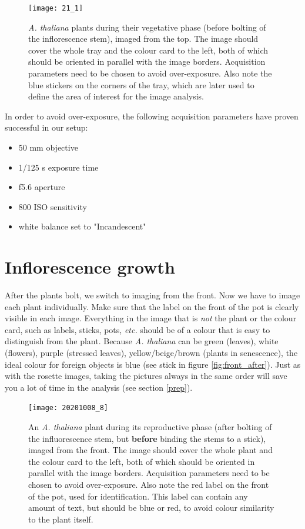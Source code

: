 \documentclass[10pt]{article}
\begin{document}
 	\begin{figure}[!h]
 		\centering
 		\texttt{[image: 21\_1]}
 		\caption[Example image of a top-view image.]{\textit{A. thaliana} plants during their vegetative phase (before bolting of the inflorescence stem), imaged from the top. The image should cover the whole tray and the colour card to the left, both of which should be oriented in parallel with the image borders. Acquisition parameters need to be chosen to avoid over-exposure. Also note the blue stickers on the corners of the tray, which are later used to define the area of interest for the image analysis.}
 		\label{fig:top}
 	\end{figure}
 
 	\noindent In order to avoid over-exposure, the following acquisition parameters have proven successful in our setup:
 
	 \begin{itemize}
	 	\item 50 mm objective
	 	\item 1/125 s exposure time
	 	\item f5.6 aperture
	 	\item 800 ISO sensitivity
	 	\item white balance set to "Incandescent"
	 \end{itemize}
 
 	\section{Inflorescence growth}
 	
 	After the plants bolt, we switch to imaging from the front. Now we have to image each plant individually. Make sure that the label on the front of the pot is clearly visible in each image. Everything in the image that is \textit{not} the plant or the colour card, such as labels, sticks, pots, \textit{etc.} should be of a colour that is easy to distinguish from the plant. Because \textit{A. thaliana} can be green (leaves), white (flowers), purple (stressed leaves), yellow/beige/brown (plants in senescence), the ideal colour for foreign objects is blue (see stick in figure \ref{fig:front_after}). Just as with the rosette images, taking the pictures always in the same order will save you a lot of time in the analysis (see section \ref{prep}).
 	
 	\begin{figure}[!h]
 		\centering
 		\texttt{[image: 20201008\_8]}
 		\caption[Example image of a front-view image.]{An \textit{A. thaliana} plant during its reproductive phase (after bolting of the influorescence stem, but \textbf{before} binding the stems to a stick), imaged from the front. The image should cover the whole plant and the colour card to the left, both of which should be oriented in parallel with the image borders. Acquisition parameters need to be chosen to avoid over-exposure. Also note the red label on the front of the pot, used for identification. This label can contain any amount of text, but should be blue or red, to avoid colour similarity to the plant itself.}
 		\label{fig:front_before}
 	\end{figure}
 
\end{document}
